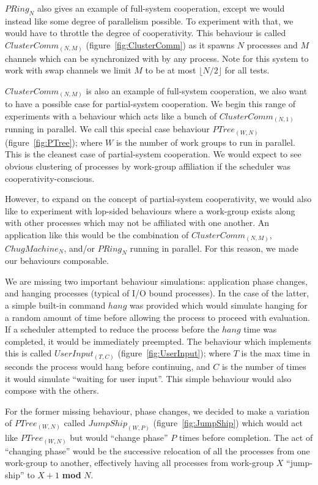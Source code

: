 $PRing_N$ also gives an example of full-system cooperation, except we would 
instead like some degree of parallelism possible. To experiment with that, we 
would have to throttle the degree of cooperativity. This behaviour is called
$ClusterComm_{(N,M)}$ (figure~\ref{fig:ClusterComm}) as it spawns $N$ processes and $M$ channels which can be
synchronized with by any process. Note for this system to work with swap 
channels we limit $M$ to be at most $\lfloor N/2 \rfloor$ for all tests. 

$ClusterComm_{(N,M)}$ is also an example of full-system cooperation, we also
want to have a possible case for partial-system cooperation. We begin this range
of experiments with a behaviour which acts like a bunch of $ClusterComm_{(N,1)}$
running in parallel. We call this special case behaviour $PTree_{(W,N)}$ (figure~\ref{fig:PTree}); where $W$ is 
the number of work groups to run in parallel. This is the cleanest case of 
partial-system cooperation. We would expect to see obvious clustering of 
processes by work-group affiliation if the scheduler was 
cooperativity-conscious.

However, to expand on the concept of partial-system cooperativity, we would 
also like to experiment with lop-sided behaviours where a work-group exists 
along with other processes which may not be affiliated with one another. An 
application like this would be the combination of $ClusterComm_{(N,M)}$, 
$ChugMachine_N$, and/or $PRing_N$ running in parallel. For this reason, we made
our behaviours composable.

We are missing two important behaviour simulations: application phase changes,
and hanging processes (typical of I/O bound processes). In the case of the 
latter, a simple built-in command $hang$ was provided which would simulate 
hanging for a random amount of time before allowing the process to proceed with
evaluation. If a scheduler attempted to reduce the process before the $hang$ 
time was completed, it would be immediately preempted. The behaviour which 
implements this is called $UserInput_{(T,C)}$ (figure~\ref{fig:UserInput}); where $T$ is the max time in seconds
the process would hang before continuing, and $C$ is the number of times it 
would simulate ``waiting for user input''. This simple behaviour would also
compose with the others.

For the former missing behaviour, phase changes, we decided to make a variation
of $PTree_{(W,N)}$ called $JumpShip_{(W,P)}$ (figure~\ref{fig:JumpShip}) which would act like $PTree_{(W,N)}$ but would
``change phase'' $P$ times before completion. The act of ``changing phase'' would 
be the successive relocation of all the processes from one work-group to 
another, effectively having all processes from work-group $X$ ``jump-ship'' to
$X+1$ \textbf{mod} $N$.

